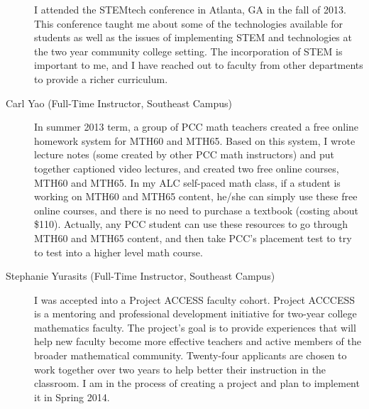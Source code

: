 \begin{description}
	I attended the STEMtech conference in Atlanta, GA in the fall of 2013. This
	conference taught me about some of the technologies available for students as
	well as the issues of implementing STEM and technologies at the two year
	community college setting. The incorporation of STEM is important to me, and I
	have reached out to faculty from other departments to provide a richer
	curriculum.

	\item[Carl Yao (Full-Time Instructor, Southeast Campus)]
	In summer 2013 term, a group of PCC math teachers created a free online
	homework system for MTH60 and MTH65. Based on this system, I wrote lecture
	notes (some created by other PCC math instructors) and put together captioned
	video lectures, and created two free online courses, MTH60 and MTH65.  In my
	ALC self-paced math class, if a student is working on MTH60 and MTH65 content,
	he/she can simply use these free online courses, and there is no need to
	purchase a textbook (costing about \$110).  Actually, any PCC student can use
	these resources to go through MTH60 and MTH65 content, and then take PCC's
	placement test to try to test into a higher level math course.

	\item[Stephanie Yurasits (Full-Time Instructor, Southeast Campus)]
	I was accepted into a Project ACCESS faculty cohort.  Project ACCCESS is a
	mentoring and professional development initiative for two-year college
	mathematics faculty. The project's goal is to provide experiences that will
	help new faculty become more effective teachers and active members of the
	broader mathematical community.  Twenty-four applicants are chosen to work
	together over two years to help better their instruction in the classroom.  I
	am in the process of creating a project and plan to implement it in Spring
	2014.
\end{description}
